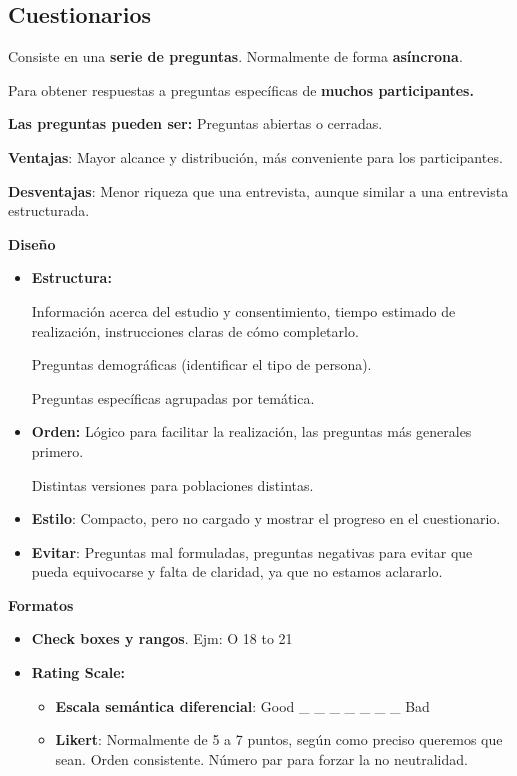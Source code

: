 \documentclass[12pt]{report} %
\begin{document}
\subsection{Cuestionarios}

Consiste en una \textbf{serie de preguntas}. Normalmente de forma
\textbf{asíncrona}.

Para obtener respuestas a preguntas específicas de \textbf{muchos
participantes.}

\textbf{Las preguntas pueden ser:} Preguntas abiertas o cerradas.

\textbf{Ventajas}: Mayor alcance y distribución, más conveniente para
los participantes.

\textbf{Desventajas}: Menor riqueza que una entrevista, aunque similar a
una entrevista estructurada.

\textbf{Diseño}

\begin{itemize}
\item
  \textbf{Estructura:}

  Información acerca del estudio y consentimiento, tiempo estimado de
  realización, instrucciones claras de cómo completarlo.

  Preguntas demográficas (identificar el tipo de persona).

  Preguntas específicas agrupadas por temática.
\item
  \textbf{Orden:} Lógico para facilitar la realización, las preguntas
  más generales primero.

  Distintas versiones para poblaciones distintas.
\item
  \textbf{Estilo}: Compacto, pero no cargado y mostrar el progreso en el
  cuestionario.
\item
  \textbf{Evitar}: Preguntas mal formuladas, preguntas negativas para
  evitar que pueda equivocarse y falta de claridad, ya que no estamos
  aclararlo.
\end{itemize}

\textbf{Formatos}

\begin{itemize}
\item
  \textbf{Check boxes y rangos}. Ejm: O 18 to 21
\item
  \textbf{Rating Scale:}

  \begin{itemize}
  
  \item
    \textbf{Escala semántica diferencial}: Good \_ \_ \_ \_ \_ \_ \_ Bad
    
    \item
      \textbf{Likert}: Normalmente de 5 a 7 puntos, según como preciso
      queremos que sean. Orden consistente. Número par para forzar la no
      neutralidad.
  \end{itemize}
\end{itemize}
\end{document}
